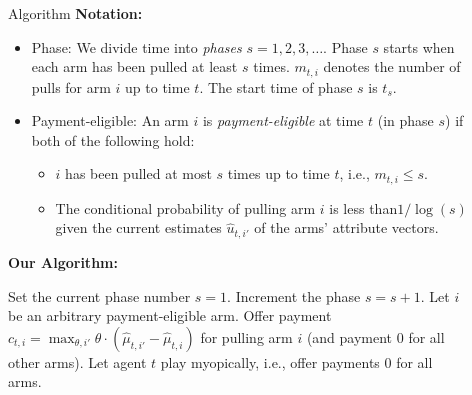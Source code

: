 \documentclass[final]{beamer}
\newlength{\sepwid}
\newlength{\onecolwid}
\begin{document}
\begin{frame}[t]
\begin{columns}[t]
\begin{column}{\onecolwid}
\begin{block}{Algorithm}
\textbf{Notation:}
\vspace{0.5cm}
\begin{itemize}
\item Phase: We divide time into \emph{phases} $s = 1, 2, 3, \ldots$. Phase $s$ starts when each arm has been pulled at least $s$ times. $m_{t,i}$ denotes the number of pulls for arm $i$ up to time $t$. The start time of phase $s$ is $t_s$. 
\item Payment-eligible: An arm $i$ is \emph{payment-eligible} at time $t$ (in phase $s$) if both of the following hold:
\begin{itemize}
\item $i$ has been pulled at most $s$ times up to time $t$, i.e., $m_{t,i} \leq s$.
\item  The conditional probability of pulling arm $i$ is less than$1/\log(s)$ given the current estimates $\hat{u}_{t,i'}$ of the arms' attribute vectors.  
\end{itemize}
\end{itemize}


\vspace{0.5cm}
\textbf{Our Algorithm:}
\vspace{0.5cm}

\begin{algorithmic}
\STATE Set the current phase number $s = 1$.
 {
\STATE Increment the phase $s = s + 1$.
\ENDIF
{} 
    \STATE Let $i$ be an arbitrary payment-eligible arm.
    \STATE Offer payment $c_{t,i} = \max_{\theta,i'} \theta \cdot (\hat{\mu}_{t,i'} - \hat{\mu}_{t,i})$ for pulling arm $i$ (and payment 0 for all other arms).
\ELSE
    \STATE Let agent $t$ play myopically, i.e., offer payments 0 for all arms.
\ENDIF 
}\ENDFOR
\end{algorithmic}

\end{block}
		
\end{column}

\begin{column}{\sepwid}\end{column} %

\begin{column}{\onecolwid} %



\end{column}
\end{columns}
\end{frame}
\end{document}
